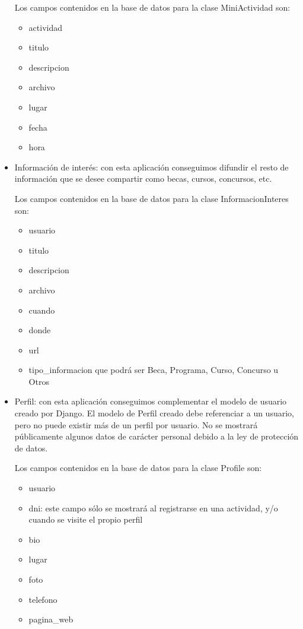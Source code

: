 \begin{itemize}
Los campos contenidos en la base de datos para la clase MiniActividad son:
	\begin{itemize}
		\item actividad
		\item titulo
		\item descripcion
		\item archivo
		\item lugar
		\item fecha
		\item hora
	\end{itemize}

\item Información de interés: con esta aplicación conseguimos difundir el resto de información que se desee compartir como becas, cursos, concursos, etc. 

Los campos contenidos en la base de datos para la clase InformacionInteres son:
	\begin{itemize}
		\item usuario
		\item titulo
		\item descripcion
		\item archivo
		\item cuando
		\item donde
		\item url
		\item tipo\_informacion que podrá ser Beca, Programa, Curso, Concurso u Otros
	\end{itemize}
	
\item Perfil: con esta aplicación conseguimos complementar el modelo de usuario creado por Django.
El modelo de Perfil creado debe referenciar a un usuario, pero no puede existir más de un perfil por usuario. 
No se mostrará públicamente algunos datos de carácter personal debido a la ley de protección de datos.

Los campos contenidos en la base de datos para la clase Profile son:
	\begin{itemize}
		\item usuario
		\item dni: este campo sólo se mostrará al registrarse en una actividad, y/o cuando se visite el propio perfil
		\item bio
		\item lugar
		\item foto 
		\item telefono
		\item pagina\_web
	\end{itemize}
	

\end{itemize}
